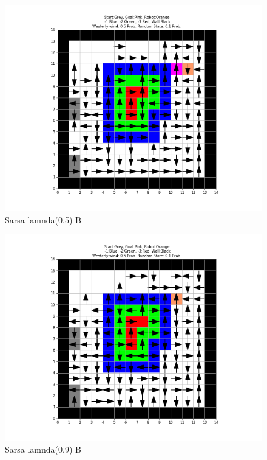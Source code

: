 \documentclass[12pt, letterpaper, twoside]{report}
\begin{document}
  \begin{figure}[b]
    \includegraphics[width=\linewidth]{Sarsa__Problem_B_lambda_05.png}
    \caption{Sarsa lamnda(0.5) B}
  \end{figure}
  \newpage
  \centering
  \begin{figure}[b]
    \includegraphics[width=\linewidth]{Sarsa__Problem_B_lambda_09.png}
    \caption{Sarsa lamnda(0.9) B}
  \end{figure}
\end{document}
